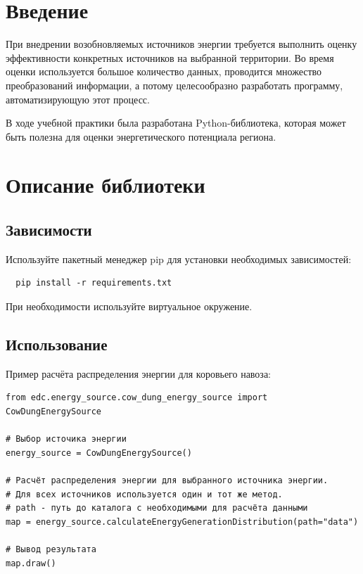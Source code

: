 \documentclass[12pt,a4paper]{scrartcl}
\begin{document}
\author{}
\date{}
\maketitle

\section{Введение}
\label{sec:intro}

При внедрении возобновляемых источников энергии требуется выполнить оценку эффективности конкретных источников на выбранной территории. Во время оценки используется большое количество данных, проводится множество преобразований информации, а потому целесообразно разработать программу, автоматизирующую этот процесс.

В ходе учебной практики была разработана Python-библиотека, которая может быть полезна для оценки энергетического потенциала региона.

\section{Описание библиотеки}
\label{sec:desc}

\subsection{Зависимости}
\label{sec:desc:dep}

Используйте пакетный менеджер pip для установки необходимых зависимостей:

\begin{verbatim}
  pip install -r requirements.txt
\end{verbatim}

При необходимости используйте виртуальное окружение.

\subsection{Использование}
\label{sec:desc:usage}

Пример расчёта распределения энергии для коровьего навоза:

\begin{verbatim}
from edc.energy_source.cow_dung_energy_source import CowDungEnergySource

# Выбор источика энергии
energy_source = CowDungEnergySource()

# Расчёт распределения энергии для выбранного источника энергии.
# Для всех источников используется один и тот же метод.
# path - путь до каталога с необходимыми для расчёта данными
map = energy_source.calculateEnergyGenerationDistribution(path="data")

# Вывод результата
map.draw()
\end{verbatim}
\end{document}
